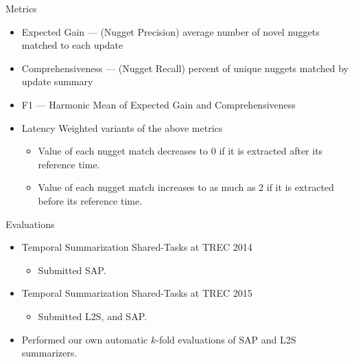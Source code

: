 \begin{frame}{Metrics}
\begin{itemize}
    \item \alert<2>{Expected Gain  --- (Nugget Precision) }
 average number of novel nuggets matched to each update

\vspace{10pt}
\item \alert<3>{Comprehensiveness --- (Nugget Recall)} percent of unique nuggets matched
by update summary
\vspace{10pt}
\item F1 --- Harmonic Mean of Expected Gain and Comprehensiveness

\vspace{10pt}
\item \alert<4>{Latency Weighted} variants of the above metrics
\begin{itemize}
\item Value of each nugget match decreases to 0 if it is extracted after its reference time.
\item Value of each nugget match increases to as much as 2 if it is 
extracted before its reference time.
\end{itemize}

\end{itemize}


\end{frame}


\begin{frame}{Evaluations}

\begin{itemize}
\item Temporal Summarization Shared-Tasks at TREC 2014 
\begin{itemize}
\item Submitted SAP.
\end{itemize}
\item Temporal Summarization Shared-Tasks at TREC 2015
\begin{itemize}
\item Submitted L2S, and SAP.
\end{itemize}
\vspace{10pt}
\item Performed our own automatic $k$-fold evaluations of SAP and L2S summarizers. 
\end{itemize}
\end{frame}

